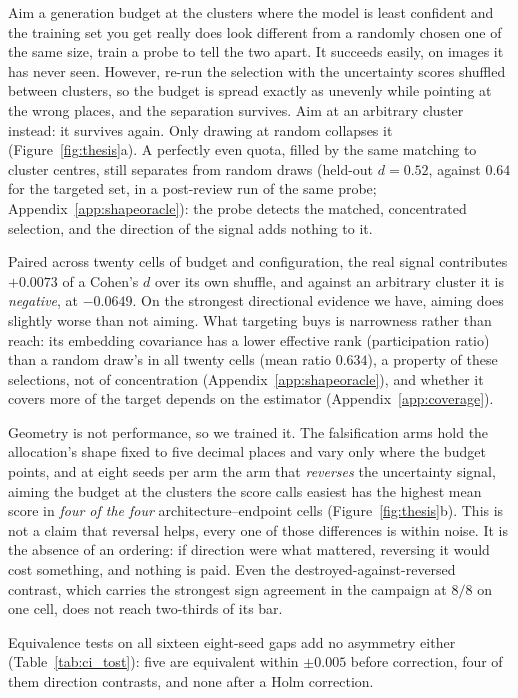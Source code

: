 \documentclass{article}
\newif\ifrevmarked \revmarkedtrue
\DeclareRobustCommand{\revB}[1]{\ifrevmarked{\color{RevB}#1}\else{#1}\fi}
\DeclareRobustCommand{\revC}[1]{\ifrevmarked{\color{RevC}#1}\else{#1}\fi}
\DeclareRobustCommand{\revShared}[1]{\ifrevmarked{\color{RevShared}#1}\else{#1}\fi}
\begin{document}
Aim a generation budget at the clusters where the model is least confident and the training set you get really does
look different from a randomly chosen one of the same size, train a probe to tell the two apart. It succeeds easily, on images it has never seen. However, re-run the selection with the uncertainty
scores shuffled between clusters, so the budget is spread exactly as unevenly while pointing at the
wrong places, and the separation survives. Aim at an arbitrary cluster instead: it survives again.
\revB{Only drawing at random collapses it (Figure~\ref{fig:thesis}a). A perfectly even quota, filled by the same matching to
cluster centres, still separates from random draws (held-out $d = 0.52$, against $0.64$ for the targeted set, in a
post-review run of the same probe; Appendix~\ref{app:shapeoracle}): the probe detects the matched, concentrated
selection, and the direction of the signal adds nothing to it.}

Paired across twenty cells of budget and configuration, the real signal contributes $+0.0073$ of a
Cohen's $d$ over its own shuffle, and against an arbitrary cluster it is \emph{negative}, at
$-0.0649$. On the strongest directional evidence we have, aiming does slightly worse than not
aiming. What targeting buys is narrowness rather than reach: its embedding covariance has a lower
effective rank \revB{(participation ratio)} than a random draw's in all twenty cells (mean ratio $0.634$)\revB{, a property of
these selections, not of concentration (Appendix~\ref{app:shapeoracle})}, \revC{and whether it covers more of the target depends on the
estimator (Appendix~\ref{app:coverage})}.

Geometry is not performance, so we trained it. The falsification arms hold the allocation's shape fixed to five decimal places and vary
only where the budget points, and at eight seeds per arm the arm that \emph{reverses} the
uncertainty signal, aiming the budget at the clusters the score calls easiest has the highest
mean score in \textit{four of the four} architecture--endpoint cells (Figure~\ref{fig:thesis}b).
This is not a claim that reversal helps, every one of those differences is within noise. It is
the absence of an ordering: if direction were what mattered, reversing it would cost something, and
nothing is paid. Even the destroyed-against-reversed contrast, which carries the strongest sign
agreement in the campaign at $8/8$ on one cell, does not reach two-thirds of its bar.

\revShared{Equivalence tests on all sixteen eight-seed gaps add no asymmetry either (Table~\ref{tab:ci_tost}): five are
equivalent within $\pm 0.005$ before correction, four of them direction contrasts, and none after a Holm correction.}
\end{document}
